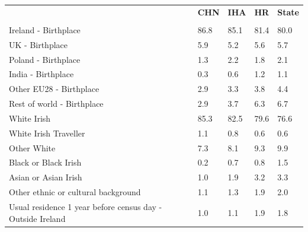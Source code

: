 \documentclass{article}
\begin{document}
\pagebreak
\begin{table}[h]	
\centering
		\begin{tabular}{KTTTT}
  \hline
& \textbf{CHN} & \textbf{IHA} & \textbf{HR}& \textbf{State}\\ 
  \hline
    \\ 
    \hline
Ireland - Birthplace & 86.8& 85.1& 81.4& 80.0\\
UK - Birthplace & 5.9& 5.2& 5.6& 5.7\\
Poland - Birthplace & 1.3& 2.2& 1.8& 2.1\\
India - Birthplace & 0.3& 0.6& 1.2& 1.1\\
Other EU28 - Birthplace & 2.9& 3.3& 3.8& 4.4\\
Rest of world - Birthplace & 2.9& 3.7& 6.3& 6.7\\
    \hline
White Irish & 85.3& 82.5& 79.6& 76.6\\
White Irish Traveller & 1.1& 0.8& 0.6& 0.6\\
Other White & 7.3& 8.1& 9.3& 9.9\\
Black or Black Irish & 0.2& 0.7& 0.8& 1.5\\
Asian or Asian Irish & 1.0& 1.9& 3.2& 3.3\\
Other ethnic or cultural background & 1.1& 1.3& 1.9& 2.0\\
    \hline
Usual residence 1 year before census day - Outside Ireland & 1.0& 1.1& 1.9& 1.8\\


\end{tabular}
\end{table}
\end{document}
